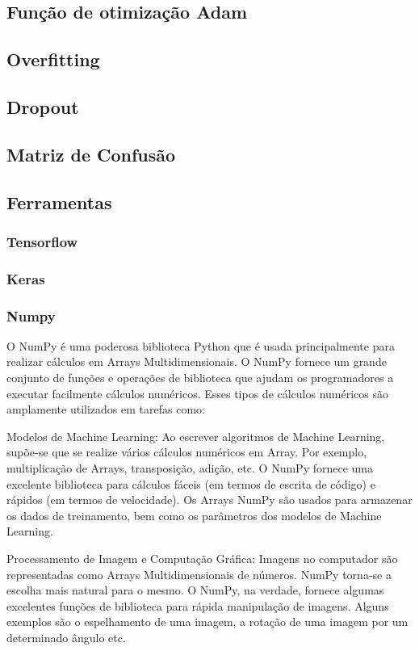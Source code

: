 \subsection{Função de otimização Adam}
\subsection{Overfitting}
\subsection{Dropout}
\subsection{Matriz de Confusão}

\subsection{Ferramentas}
\subsubsection{Tensorflow}
\subsubsection{Keras}

\subsubsection{Numpy}

O NumPy é uma poderosa biblioteca Python que é usada principalmente para realizar cálculos em Arrays Multidimensionais. O NumPy fornece um grande conjunto de funções e operações de biblioteca que ajudam os programadores a executar facilmente cálculos numéricos. Esses tipos de cálculos numéricos são amplamente utilizados em tarefas como:

Modelos de Machine Learning: Ao escrever algoritmos de Machine Learning, supõe-se que se realize vários cálculos numéricos em Array. Por exemplo, multiplicação de Arrays, transposição, adição, etc. O NumPy fornece uma excelente biblioteca para cálculos fáceis (em termos de escrita de código) e rápidos (em termos de velocidade). Os Arrays NumPy são usados para armazenar os dados de treinamento, bem como os parâmetros dos modelos de Machine Learning.

Processamento de Imagem e Computação Gráfica: Imagens no computador são representadas como Arrays Multidimensionais de números. NumPy torna-se a escolha mais natural para o mesmo. O NumPy, na verdade, fornece algumas excelentes funções de biblioteca para rápida manipulação de imagens. Alguns exemplos são o espelhamento de uma imagem, a rotação de uma imagem por um determinado ângulo etc.

